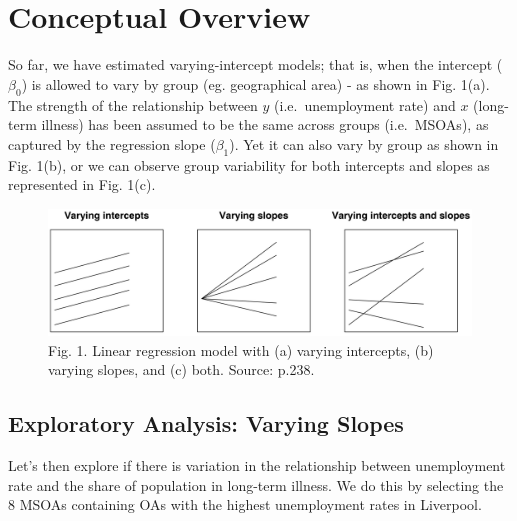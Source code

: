 \documentclass[]{book}
\newenvironment{Shaded}{\begin{snugshade}}{\end{snugshade}}
\newcommand{\KeywordTok}[1]{\textcolor[rgb]{0.13,0.29,0.53}{\textbf{#1}}}
\newcommand{\DecValTok}[1]{\textcolor[rgb]{0.00,0.00,0.81}{#1}}
\newcommand{\StringTok}[1]{\textcolor[rgb]{0.31,0.60,0.02}{#1}}
\newcommand{\CommentTok}[1]{\textcolor[rgb]{0.56,0.35,0.01}{\textit{#1}}}
\newcommand{\OperatorTok}[1]{\textcolor[rgb]{0.81,0.36,0.00}{\textbf{#1}}}
\newcommand{\NormalTok}[1]{#1}
\begin{document}
\section{Conceptual Overview}\label{conceptual-overview}

So far, we have estimated varying-intercept models; that is, when the
intercept (\(\beta_{0}\)) is allowed to vary by group (eg. geographical
area) - as shown in Fig. 1(a). The strength of the relationship between
\(y\) (i.e.~unemployment rate) and \(x\) (long-term illness) has been
assumed to be the same across groups (i.e.~MSOAs), as captured by the
regression slope (\(\beta_{1}\)). Yet it can also vary by group as shown
in Fig. 1(b), or we can observe group variability for both intercepts
and slopes as represented in Fig. 1(c).

\begin{figure}
\centering
\includegraphics{figs/ch6/fig11.1_Gelman_Hill.png}
\caption{Fig. 1. Linear regression model with (a) varying intercepts,
(b) varying slopes, and (c) both. Source: \citet{Gelman_Hill_2006_book}
p.238.}
\end{figure}

\subsection{Exploratory Analysis: Varying
Slopes}\label{exploratory-analysis-varying-slopes}

Let's then explore if there is variation in the relationship between
unemployment rate and the share of population in long-term illness. We
do this by selecting the 8 MSOAs containing OAs with the highest
unemployment rates in Liverpool.

\begin{Shaded}
\end{Shaded}
\end{document}
